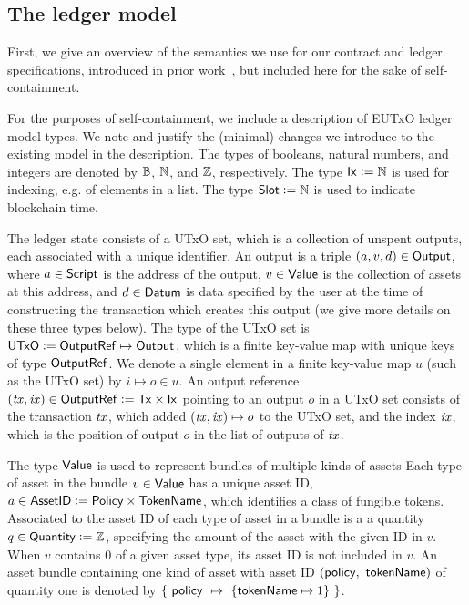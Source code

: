 \subsection{The \EUTXO ledger model}
\label{sec:sts}

First, we give an overview of the semantics we use for
our contract and ledger specifications,
introduced in prior work~\cite{eutxo,eutxoma,structured},
but included here for the sake of self-containment.

For the purposes of self-containment, we include a description of EUTxO ledger
model types.
We note and justify the (minimal) changes we introduce to the existing model in the description.
The types of booleans, natural numbers, and integers are denoted by
$\mathbb{B}$, $\mathbb{N}$, and $\mathbb{Z}$, respectively. The type $\mathsf{Ix} \mathrel{\mathop:}= \mathbb{N}$ is used for indexing,
e.g. of elements in a list. The type $\mathsf{Slot} \mathrel{\mathop:}= \mathbb{N}$ is used to indicate
blockchain time.

The ledger state consists of a UTxO set,
which is a collection of unspent outputs, each associated with a unique identifier.
An output is a triple
$(a, v, d) \in \mathsf{Output}$, where $a \in \textsf{Script}$ is the address of the output,
$v \in \mathsf{Value}$ is the collection of assets at this address, and $d \in \mathsf{Datum}$ is
data specified by the user at the time of constructing the transaction which
creates this output (we give more details on these three types below).
The type of
the UTxO set is $\mathsf{UTxO} \mathrel{\mathop:}= \mathsf{OutputRef} \mapsto \mathsf{Output}$, which is
a finite key-value map with unique keys of type $\mathsf{OutputRef}$. We denote a single
element in a finite key-value map $u$ (such as the UTxO set) by $i \mapsto o \in u$.
An output reference $(\mathit{tx}, \mathit{ix}) \in \mathsf{OutputRef} \mathrel{\mathop:}= \mathsf{Tx} \times \mathsf{Ix}$ pointing
to an output $o$ in a UTxO set consists of the transaction $\mathit{tx}$, which
added $(\mathit{tx}, \mathit{ix}) \mapsto o$ to the UTxO set, and the index $\mathit{ix}$,
which is the position of output $o$ in the list of outputs of $\mathit{tx}$.

The type $\mathsf{Value}$ is used to represent bundles of multiple kinds of assets
Each type of asset in the bundle $v \in \mathsf{Value}$ has a
unique asset ID, $a \in \mathsf{AssetID} \mathrel{\mathop:}= \textsf{Policy} \times \mathsf{TokenName}$, which
identifies a class of fungible tokens. Associated to the asset ID of each
type of asset in a bundle is a a quantity $q \in \textsf{Quantity} \mathrel{\mathop:}= \mathbb{Z}$, specifying
the amount of the asset with the given ID in $v$. When $v$ contains $0$ of a
given asset type, its asset ID is not included in $v$.
An asset bundle containing one kind of asset
with asset ID $(\mathsf{policy},~\mathsf{tokenName})$
of quantity one is denoted by $\{~\mathsf{policy} ~\mapsto~\{ \mathsf{tokenName} \mapsto 1 \}~\}$.

